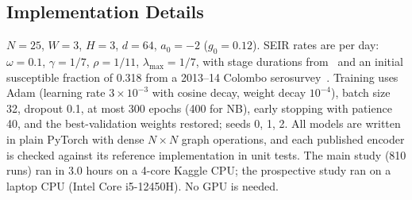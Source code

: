 \subsection{Implementation Details}
\label{sec:impl}
$N=25$, $W=3$, $H=3$, $d=64$, $a_0=-2$ ($g_0=0.12$). SEIR rates are per day:
$\omega=0.1$, $\gamma=1/7$, $\rho=1/11$, $\lambda_{\max}=1/7$, with stage durations
from~\cite{phaijoo2018sensitivity} and an initial susceptible fraction of 0.318 from a
2013--14 Colombo serosurvey~\cite{jeewandara2015seroprevalence}. Training uses Adam (learning rate $3\times10^{-3}$ with cosine decay,
weight decay $10^{-4}$), batch size 32, dropout 0.1, at most 300 epochs (400 for NB), early stopping
with patience 40, and the best-validation weights restored; seeds 0, 1, 2. All models
are written in plain PyTorch with dense $N\times N$ graph operations, and each
published encoder is checked against its reference implementation in unit tests.
The main study (810 runs) ran in 3.0 hours on a 4-core Kaggle CPU; the prospective study
ran on a laptop CPU (Intel Core i5-12450H). No GPU is needed.
